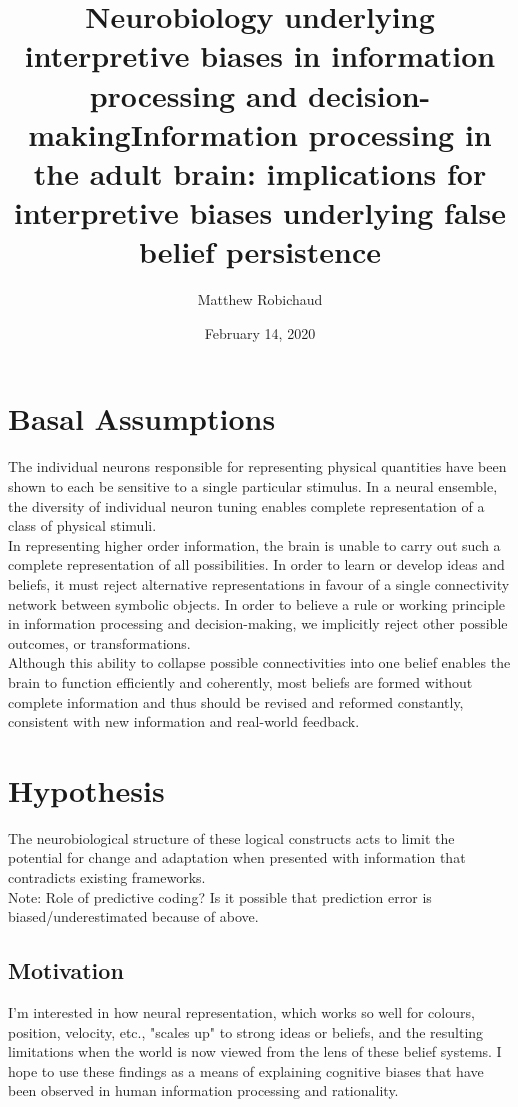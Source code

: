 \documentclass[12pt]{amsart}
\title{Neurobiology underlying interpretive biases in information processing and decision-making}
\title{Information processing in the adult brain: implications for interpretive biases underlying false belief persistence}
\author{Matthew Robichaud}
\date{February 14, 2020} %
\begin{document}
\maketitle
\section{Basal Assumptions}
The individual neurons responsible for representing physical quantities have been shown to each be sensitive to a single particular stimulus.
In a neural ensemble, the diversity of individual neuron tuning enables complete representation of a class of physical stimuli. \\

In representing higher order information, the brain is unable to carry out such a complete representation of all possibilities. 
In order to learn or develop ideas and beliefs, it must reject alternative representations in favour of a single connectivity network between symbolic objects. 
In order to believe a rule or working principle in information processing and decision-making, we implicitly reject other possible outcomes, or transformations. \\ 

Although this ability to collapse possible connectivities into one belief enables the brain to function efficiently and coherently, most beliefs are formed without complete information and thus should be revised and reformed constantly, consistent with new information and real-world feedback. \\

\section{Hypothesis}
The neurobiological structure of these logical constructs acts to limit the potential for change and adaptation when presented with information that contradicts existing frameworks. \\
{\small Note: Role of predictive coding? Is it possible that prediction error is biased/underestimated because of above.} \\
\subsection{Motivation}
I'm interested in how neural representation, which works so well for colours, position, velocity, etc., "scales up" to strong ideas or beliefs, and the resulting limitations when the world is now viewed from the lens of these belief systems. I hope to use these findings as a means of explaining cognitive biases that have been observed in human information processing and rationality.
\end{document}
